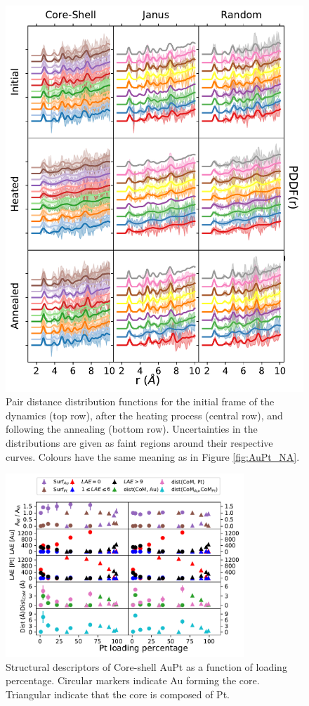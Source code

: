 \begin{figure}
    \centering
    \includegraphics{figures/MD/Alloys/Melt_Au-Pt.pdf}
    \caption{Pair distance distribution functions for the initial frame of the dynamics (top row), after the heating process (central row), and following the annealing (bottom row). Uncertainties in the distributions are given as faint regions around their respective curves. Colours have the same meaning as in Figure \ref{fig:AuPt_NA}. }
    \label{fig:AuPt_PDF}
\end{figure}

\begin{figure}
    \centering
    \includegraphics[width=0.8\textwidth]{figures/MD/Alloys/Core-Shell_Au-Pt.pdf}
    \caption{Structural descriptors of Core-shell AuPt as a function of loading percentage. Circular markers indicate Au forming the core. Triangular indicate that the core is composed of Pt.}
    \label{fig:AuPtCS_Dyn}
\end{figure}

